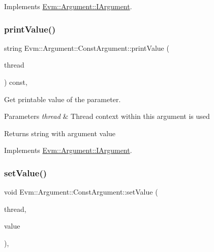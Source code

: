 Implements \mbox{\hyperlink{struct_evm_1_1_argument_1_1_i_argument_a35bdae816e89f6f9fc393b6e03c5e521}{Evm\+::\+Argument\+::\+I\+Argument}}.

\mbox{\label{struct_evm_1_1_argument_1_1_const_argument_a5741f701088fadebf19b733c6973898b}} 
\subsubsection{\texorpdfstring{print\+Value()}{printValue()}}
{\footnotesize\ttfamily string Evm\+::\+Argument\+::\+Const\+Argument\+::print\+Value (\begin{DoxyParamCaption}\item[{\mbox{\hyperlink{struct_evm_1_1_thread_context}{Thread\+Context}} \&}]{thread }\end{DoxyParamCaption}) const\hspace{0.3cm}{\ttfamily [override]}, {\ttfamily [virtual]}}



Get printable value of the parameter. 


\begin{DoxyParams}{Parameters}
{\em thread} & Thread context within this argument is used \\
\hline
\end{DoxyParams}
\begin{DoxyReturn}{Returns}
string with argument value 
\end{DoxyReturn}


Implements \mbox{\hyperlink{struct_evm_1_1_argument_1_1_i_argument_afcab2d2a1515518a111881a635c83da3}{Evm\+::\+Argument\+::\+I\+Argument}}.

\mbox{\label{struct_evm_1_1_argument_1_1_const_argument_ab456fa9175551b4c04815ccd65c76bd2}} 
\subsubsection{\texorpdfstring{set\+Value()}{setValue()}}
{\footnotesize\ttfamily void Evm\+::\+Argument\+::\+Const\+Argument\+::set\+Value (\begin{DoxyParamCaption}\item[{\mbox{\hyperlink{struct_evm_1_1_thread_context}{Thread\+Context}} \&}]{thread,  }\item[{uint64\+\_\+t}]{value }\end{DoxyParamCaption})\hspace{0.3cm}{\ttfamily [override]}, {\ttfamily [virtual]}}



